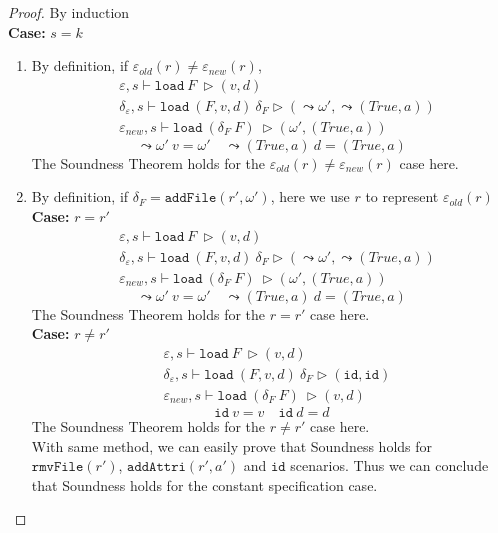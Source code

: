 \documentclass[10pt,twoside,a4paper]{article}
\theoremstyle{theorem}
\theoremstyle{lemma}
\theoremstyle{property}
\theoremstyle{definition}
\theoremstyle{assumption}
\begin{document}
\begin{proof}
	By induction\\
	\textbf{Case: } $s = k$\\
	\begin{enumerate}
	\item
	By definition, if $\varepsilon_{old}(r) \not= \varepsilon_{new}(r)$,
	\begin{align*}
			& \varepsilon, s \vdash \mathtt{load}~ F~ \rhd (v,d)\\
			& \delta_\varepsilon, s \vdash \mathtt{load}~ (F,v,d)~ \delta_F \rhd (\leadsto \omega', \leadsto (True, a))\\
			& \varepsilon_{new}, s \vdash \mathtt{load}~ (\delta_F~F)~ \rhd (\omega', (True, a))
	\end{align*}
	\begin{displaymath}
		\leadsto \omega' ~v = \omega' \quad \leadsto (True, a) ~d = (True, a)
	\end{displaymath}
	The Soundness Theorem holds for the $\varepsilon_{old}(r) \not= \varepsilon_{new}(r)$ case here. \\

	\item
	By definition, if $\delta_F = \mathtt{addFile}(r',\omega')$, here we use $r$ to represent $\varepsilon_{old}(r)$ \\
	\textbf{Case: } $r = r'$
	\begin{align*}
			& \varepsilon, s \vdash \mathtt{load}~ F~ \rhd (v,d)\\
			& \delta_\varepsilon, s \vdash \mathtt{load}~ (F,v,d)~ \delta_F \rhd (\leadsto \omega', \leadsto (True, a))\\
			& \varepsilon_{new}, s \vdash \mathtt{load}~ (\delta_F~F)~ \rhd (\omega', (True, a))
	\end{align*}
	\begin{displaymath}
		\leadsto \omega' ~v = \omega' \quad \leadsto (True, a) ~d = (True, a)
	\end{displaymath}
	The Soundness Theorem holds for the $r = r'$ case here. \\
	\textbf{Case: } $r \not= r'$
	\begin{align*}
			& \varepsilon, s \vdash \mathtt{load}~ F~ \rhd (v,d)\\
			& \delta_\varepsilon, s \vdash \mathtt{load}~ (F,v,d)~ \delta_F \rhd (\mathtt{id}, \mathtt{id})\\
			& \varepsilon_{new}, s \vdash \mathtt{load}~ (\delta_F~F)~ \rhd (v,d)
	\end{align*}
	\begin{displaymath}
		\mathtt{id} ~v = v \quad \mathtt{id} ~d = d
	\end{displaymath}
	The Soundness Theorem holds for the $r \not= r'$ case here.\\
	With same method, we can easily prove that Soundness holds for $\mathtt{rmvFile}(r')$, $\mathtt{addAttri}(r', a')$ and $\mathtt{id}$ scenarios. Thus we can conclude that Soundness holds for the constant specification case.
	\end{enumerate}
	

\end{proof}
\end{document}
